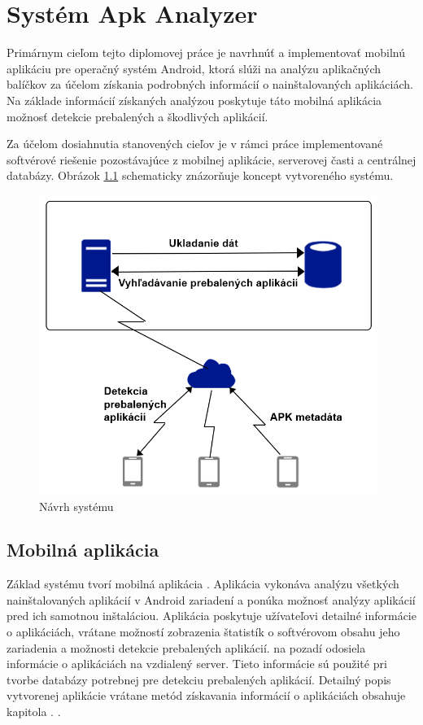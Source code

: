 \chapter{Systém Apk Analyzer}
\label{chap:apk-analyzer}

Primárnym cieľom tejto diplomovej práce je navrhnúť a implementovať mobilnú aplikáciu pre operačný systém Android, ktorá slúži na analýzu aplikačných balíčkov za účelom získania podrobných informácií o nainštalovaných aplikáciách. Na základe informácií získaných analýzou poskytuje táto mobilná aplikácia možnosť detekcie prebalených a škodlivých aplikácií. 

Za účelom dosiahnutia stanovených cieľov je v rámci práce implementované softvérové riešenie pozostávajúce z mobilnej aplikácie, serverovej časti a centrálnej databázy. Obrázok \ref{fig:systémApkAnalyzer} schematicky znázorňuje koncept vytvoreného systému.

\begin{figure}[htb]
  \begin{center}
    \includegraphics[width=110mm]{images/system-overview.png}
  \end{center}
  \caption{Návrh systému }
  \label{fig:systémApkAnalyzer}
\end{figure}

\section{Mobilná aplikácia}
Základ systému tvorí mobilná aplikácia . Aplikácia vykonáva analýzu všetkých nainštalovaných aplikácií v Android zariadení a ponúka možnosť analýzy aplikácií pred ich samotnou inštaláciou. Aplikácia poskytuje užívateľovi detailné informácie o aplikáciách, vrátane možností zobrazenia štatistík o softvérovom obsahu jeho zariadenia a možnosti detekcie prebalených aplikácií.  na pozadí odosiela informácie o aplikáciách na vzdialený server. Tieto informácie sú použité pri tvorbe databázy potrebnej pre detekciu prebalených aplikácií. Detailný popis vytvorenej aplikácie vrátane metód získavania informácií o aplikáciách obsahuje kapitola \label{chap:mobilna-aplikacia}.
.

